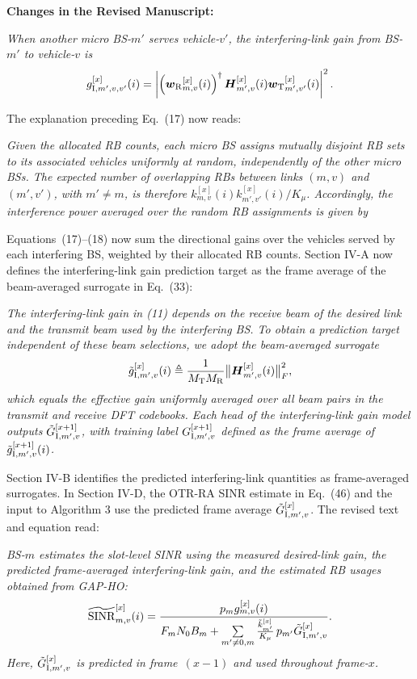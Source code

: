 \documentclass[11pt]{article}
\newenvironment{reviewedit}[1]
{\colorlet{responseblue}{#1}\colorlet{changeblue}{#1}\color{#1}}
{}
\newenvironment{manuscriptchanges}
{\par\noindent\textcolor{changeblue}{\textbf{Changes in the Revised Manuscript:}}\par\color{changeblue}}
{\par}
\begin{document}
\begin{reviewedit}{blue}
\begin{manuscriptchanges}
\emph{When another micro BS-$m'$ serves vehicle-$v'$, the interfering-link gain from BS-$m'$ to vehicle-$v$ is}
\[
    g_{{\rm I},m',v,v'}^{[x]}(i)
    = \left|\left({\boldsymbol{w}_{\rm R}}_{m,v}^{[x]}(i)\right)^{\dagger}
    \boldsymbol{H}_{m',v}^{[x]}(i){\boldsymbol{w}_{\rm T}}_{m',v'}^{[x]}(i)\right|^2.
\]

The explanation preceding Eq.~(17) now reads:

\emph{Given the allocated RB counts, each micro BS assigns mutually disjoint RB sets to its associated vehicles uniformly at random, independently of the other micro BSs. The expected number of overlapping RBs between links $(m,v)$ and $(m',v')$, with $m'\ne m$, is therefore $k_{m,v}^{[x]}(i)k_{m',v'}^{[x]}(i)/K_\mu$. Accordingly, the interference power averaged over the random RB assignments is given by}

Equations~(17)--(18) now sum the directional gains over the vehicles
served by each interfering BS, weighted by their allocated RB counts.
Section IV-A now defines the interfering-link gain prediction target as
the frame average of the beam-averaged surrogate in Eq.~(33):

\emph{The interfering-link gain in (11) depends on the receive beam of the desired link and the transmit beam used by the interfering BS. To obtain a prediction target independent of these beam selections, we adopt the beam-averaged surrogate}
\[
    \tilde{g}_{{\rm I},m',v}^{[x]}(i)
    \triangleq \frac{1}{M_{\rm T}M_{\rm R}}
    \bigl\|\boldsymbol{H}_{m',v}^{[x]}(i)\bigr\|_F^2,
\]
\emph{which equals the effective gain uniformly averaged over all beam pairs in the transmit and receive DFT codebooks. Each head of the interfering-link gain model outputs $\Tilde{G}_{{\rm I},m',v}^{[x+1]}$, with training label $G_{{\rm I},m',v}^{[x+1]}$ defined as the frame average of $\tilde{g}_{{\rm I},m',v}^{[x+1]}(i)$.}

Section IV-B identifies the predicted interfering-link quantities as
frame-averaged surrogates. In Section IV-D, the OTR-RA SINR estimate
in Eq.~(46) and the input to Algorithm 3 use the predicted frame average
$\Tilde{G}_{{\rm I},m',v}^{[x]}$. The revised text and equation read:

\emph{BS-$m$ estimates the slot-level SINR using the measured desired-link gain, the predicted frame-averaged interfering-link gain, and the estimated RB usages obtained from GAP-HO:}
\[
    \widetilde{\mathrm{SINR}}_{m,v}^{[x]}(i)
    = \frac{p_m g_{m,v}^{[x]}(i)}
    {F_m N_0 B_m + \sum\limits_{m'\neq 0,m}
    \frac{\Tilde{k}_{m'}^{[x]}}{K_\mu}\,p_{m'}\Tilde{G}_{{\rm I},m',v}^{[x]}}.
\]
\emph{Here, $\Tilde{G}_{{\rm I},m',v}^{[x]}$ is predicted in frame~$(x-1)$ and used throughout frame-$x$.}


\end{manuscriptchanges}
\end{reviewedit}
\end{document}
